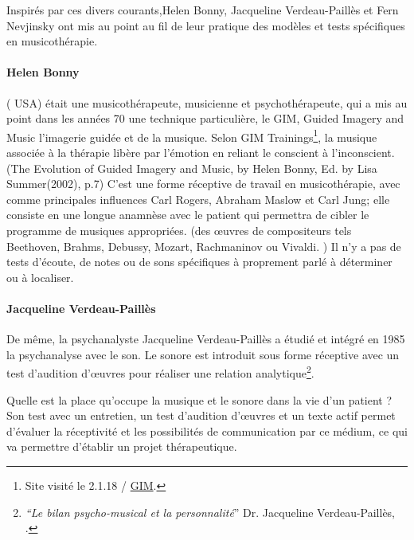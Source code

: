 	
Inspirés par ces divers courants,Helen Bonny, Jacqueline Verdeau-Paillès et Fern Nevjinsky ont  mis au point au fil de leur pratique des modèles et tests spécifiques en musicothérapie.


\paragraph{Helen Bonny } ( USA) était une musicothérapeute,
musicienne et psychothérapeute, qui a mis au point dans les années 70
une technique particulière, le GIM, \og Guided Imagery and Music\fg
l'imagerie guidée et de la musique. Selon GIM
Trainings\footnote{Site visité le 2.1.18 / \href{\#gimsite}{GIM}.}, la
musique associée à la thérapie libère par l'émotion en reliant le
conscient à l'inconscient.(The Evolution of Guided Imagery and Music, by Helen Bonny, Ed. by Lisa Summer(2002), p.7)
 C'est une forme réceptive de travail
en musicothérapie, avec comme principales influences Carl Rogers, Abraham Maslow et Carl Jung; elle  consiste en une longue anamnèse avec le
patient qui permettra de cibler le programme de musiques appropriées. 
(des \oe uvres de compositeurs tels Beethoven, Brahms, Debussy,
Mozart, Rachmaninov ou Vivaldi. )
Il n'y a  pas de
tests d'écoute, de notes ou de sons spécifiques à proprement parlé à déterminer ou à localiser.

\paragraph{Jacqueline Verdeau-Paillès}De même, la psychanalyste Jacqueline Verdeau-Paillès a étudié et
intégré en 1985 la psychanalyse avec le son.  Le sonore est  introduit
sous forme réceptive avec un test d'audition d'\oe uvres pour réaliser
une relation analytique\footnote{\emph{``Le bilan psycho-musical et la
    personnalité}'' Dr. Jacqueline Verdeau-Paillès,
  \cite{verdeau-pailles}.}.

Quelle est la place qu'occupe la musique et le sonore dans la vie d'un patient ? Son test avec un entretien, un test d'audition d'\oe uvres et un texte actif permet d'évaluer la réceptivité et les possibilités de communication par ce médium, ce qui va permettre d'établir un projet thérapeutique.

